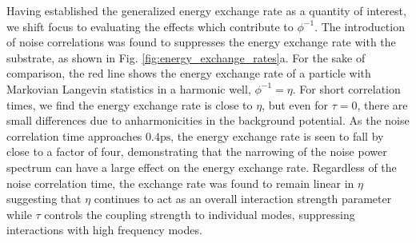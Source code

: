 \documentclass[7pt]{article}
\newcommand{\ps}{\si{\pico\second}}
\begin{document}
Having established the generalized energy exchange rate as a quantity of interest, we shift focus to evaluating the effects which contribute to $\phi^{-1}$. The introduction of noise correlations was found to suppresses the energy exchange rate with the substrate, as shown in Fig. \ref{fig:energy_exchange_rates}a. For the sake of comparison, the red line shows the energy exchange rate of a particle with Markovian Langevin statistics in a harmonic well, $\phi^{-1}=\eta$. For short correlation times, we find the energy exchange rate is close to $\eta$, but even for $\tau=0$, there are small differences due to anharmonicities in the background potential. As the noise correlation time approaches $0.4\ps$, the energy exchange rate is seen to fall by close to a factor of four, demonstrating that the narrowing of the noise power spectrum can have a large effect on the energy exchange rate. Regardless of the noise correlation time, the exchange rate was found to remain linear in $\eta$ suggesting that $\eta$ continues to act as an overall interaction strength parameter while $\tau$ controls the coupling strength to individual modes, suppressing interactions with high frequency modes. 
\end{document}
